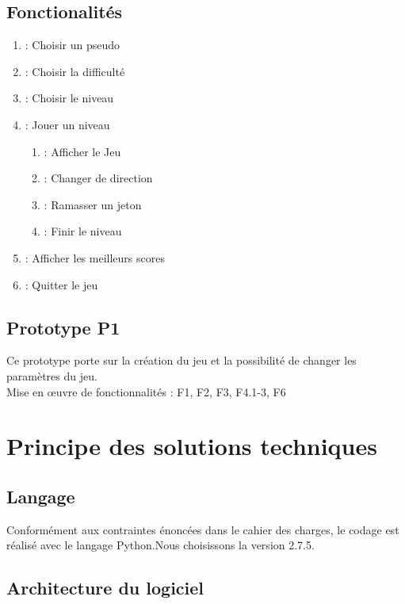 \documentclass[a4paper,11pt]{scrartcl}
\begin{document}
\subsection{Fonctionalités}

\begin{enumerate}[label*= F\arabic*,font = \textbf]
    \item : Choisir un pseudo
    \item : Choisir la difficulté
    \item : Choisir le niveau
    \item : Jouer un niveau
    \begin{enumerate}[label*=.\arabic*,font = \textbf]
        \item : Afficher le Jeu
        \item : Changer de direction
        \item : Ramasser un jeton
        \item : Finir le niveau
    \end{enumerate}
    \item : Afficher les meilleurs scores
    \item : Quitter le jeu
\end{enumerate}

\subsection{Prototype P1}

Ce prototype porte sur la création du jeu et la possibilité de changer les paramètres du jeu.\\
Mise en œuvre de fonctionnalités : F1, F2, F3, F4.1-3, F6

\section{Principe des solutions techniques}

\subsection{Langage}

Conformément aux contraintes énoncées dans le cahier des charges, le codage est réalisé avec le langage Python.Nous choisissons la version 2.7.5.

\subsection{Architecture du logiciel}
\end{document}

